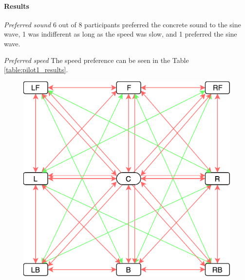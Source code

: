 \paragraph{Results} \hfill

\textit{Preferred sound} 6 out of 8 participants preferred the concrete sound to the sine wave, 1 was indifferent as long as the speed was slow, and 1 preferred the sine wave.

\textit{Preferred speed} The speed preference can be seen in the Table \ref{table:pilot1_results}.

\begin{figure}
	\centering
	\includegraphics[width=.5\linewidth]{figures/pilot1_top_down_scene_view.png}
	

\end{figure}
